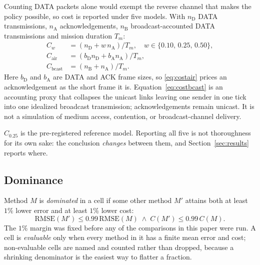Counting DATA packets alone would exempt the reverse channel that makes
the policy possible, so cost is reported under five models. With
$n_{\mathrm{D}}$ DATA transmissions, $n_{\mathrm{A}}$ acknowledgements,
$n_{\mathrm{B}}$ broadcast-accounted DATA transmissions and mission
duration $T_m$:
\begin{align}
C_w &= (n_{\mathrm{D}} + w\, n_{\mathrm{A}})/T_m,
   \quad w \in \{0.10,\,0.25,\,0.50\},
   \label{eq:costw}\\
C_{\mathrm{air}} &= (b_{\mathrm{D}} n_{\mathrm{D}} +
   b_{\mathrm{A}} n_{\mathrm{A}})/T_m,
   \label{eq:costair}\\
C_{\mathrm{bcast}} &= (n_{\mathrm{B}} + n_{\mathrm{A}})/T_m .
   \label{eq:costbcast}
\end{align}
Here $b_{\mathrm{D}}$ and $b_{\mathrm{A}}$ are DATA and ACK frame sizes,
so \eqref{eq:costair} prices an acknowledgement as the short frame it is.
Equation~\eqref{eq:costbcast} is an accounting proxy that collapses the
unicast links leaving one sender in one tick into one idealized broadcast
transmission; acknowledgements remain unicast. It is not a simulation of
medium access, contention, or broadcast-channel delivery.

$C_{0.25}$ is the pre-registered reference model. Reporting all five is
not thoroughness for its own sake: the conclusion \emph{changes} between
them, and Section~\ref{sec:results} reports where.

\subsection{Dominance}

Method $M$ is \emph{dominated} in a cell if some other method $M'$ attains
both at least $1\%$ lower error and at least $1\%$ lower cost:
\begin{equation}
\mathrm{RMSE}(M') \le 0.99\,\mathrm{RMSE}(M)
\;\wedge\;
C(M') \le 0.99\,C(M) .
\label{eq:dominance}
\end{equation}
The $1\%$ margin was fixed before any of the comparisons in this paper
were run. A cell is \emph{evaluable} only when every method in it has a
finite mean error and cost; non-evaluable cells are named and counted
rather than dropped, because a shrinking denominator is the easiest way to
flatter a fraction.
